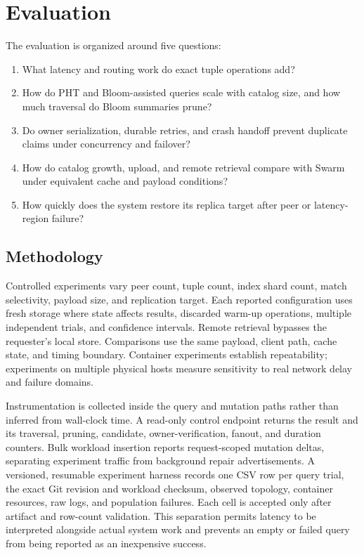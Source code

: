 \documentclass[conference]{IEEEtran}
\begin{document}
\section{Evaluation}
\label{sec:evaluation}

The evaluation is organized around five questions:
\begin{enumerate}
    \item What latency and routing work do exact tuple operations add?
    \item How do PHT and Bloom-assisted queries scale with catalog size, and
    how much traversal do Bloom summaries prune?
    \item Do owner serialization, durable retries, and crash handoff prevent
    duplicate claims under concurrency and failover?
    \item How do catalog growth, upload, and remote retrieval compare with
    Swarm under equivalent cache and payload conditions?
    \item How quickly does the system restore its replica target after peer or
    latency-region failure?
\end{enumerate}

\subsection{Methodology}

Controlled experiments vary peer count, tuple count, index shard count, match
selectivity, payload size, and replication target. Each reported configuration uses fresh storage
where state affects results, discarded warm-up operations, multiple independent
trials, and confidence intervals. Remote retrieval bypasses the requester's
local store. Comparisons use the same payload, client path, cache state, and
timing boundary. Container experiments establish repeatability; experiments on
multiple physical hosts measure sensitivity to real network delay and failure
domains.

Instrumentation is collected inside the query and mutation paths rather than
inferred from wall-clock time. A read-only control endpoint returns the result
and its traversal, pruning, candidate, owner-verification, fanout, and duration
counters. Bulk workload insertion reports request-scoped mutation deltas,
separating experiment traffic from background repair advertisements. A
versioned, resumable experiment harness records one CSV row per query trial,
the exact Git revision and workload checksum, observed topology, container
resources, raw logs, and population failures. Each cell is accepted only after
artifact and row-count validation.
This separation permits latency to be interpreted alongside actual system work
and prevents an empty or failed query from being reported as an inexpensive
success.
\end{document}
